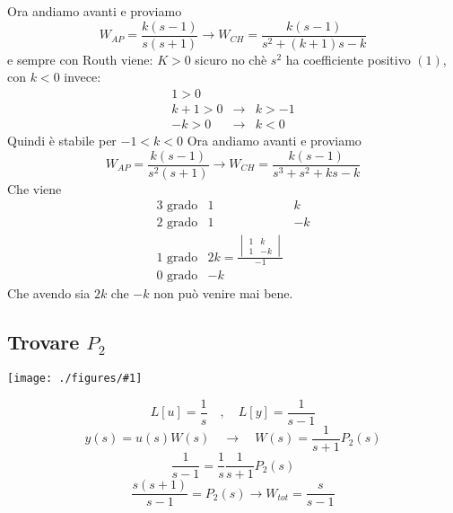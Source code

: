 \documentclass{article}
\newcommand{\incfig}[2]{%
	\texttt{[image: ./figures/\#1]}%
}
\begin{document}
Ora andiamo avanti e proviamo 
\[ 
    W_{AP} = \frac{k(s-1)}{s(s+1)} \to W_{CH} = \frac{k(s-1)}{s^2+(k+1)s-k}
\]
e sempre con Routh viene:
$K>0$ sicuro no chè $s^2$ ha coefficiente positivo $(1)$, con $k<0$ invece:
\begin{align*}
    1>0\\
    k+1>0 &\to& k>-1\\
    -k>0 &\to& k <0
\end{align*}
Quindi è stabile per $-1<k<0$
Ora andiamo avanti e proviamo 
\[ 
    W_{AP} = \frac{k(s-1)}{s^2(s+1)} \to W_{CH} = \frac{k(s-1)}{s^3+s^2+ks-k}
\]
Che viene 
\begin{align*}
    3\text{ grado}&1&k\\
    2\text{ grado}&1&-k\\
    1\text{ grado}& 2k= \frac{\begin{vmatrix}
    1 & k \\
    1 & -k
    \end{vmatrix}}{-1} \\
    0\text{ grado}&-k
\end{align*}
Che avendo sia $2k$ che $-k$ non può venire mai bene.

\subsection{Trovare $P_2$ }

\incfig{p1ps.jpeg}{0.5}

\[ L[u] = \frac{1}{s} \quad,\quad L[y] = \frac{1}{s-1}\]
\[ y(s) = u(s)W(s) \quad\to\quad W(s)=\frac{1}{s+1}P_2(s) \]
\[ \frac{1}{s-1} = \frac{1}{s}\frac{1}{s+1}P_2(s) \]
\[ \frac{s(s+1)}{s-1} = P_2(s) \to W_{tot}=\frac{s}{s-1} \]
\end{document}
